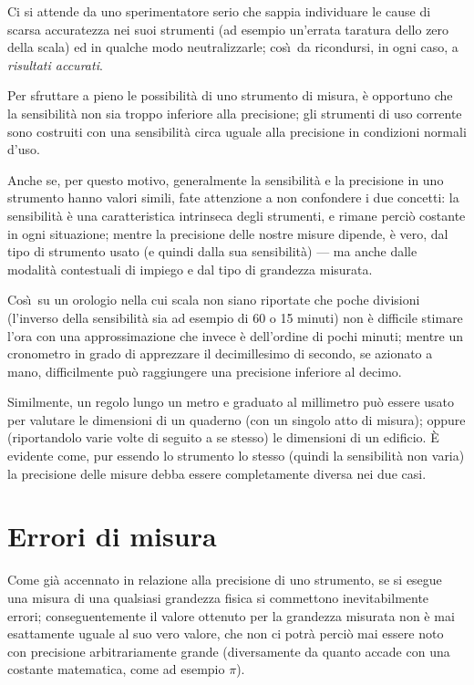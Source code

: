 \begin{itemize}
  Ci si attende da uno sperimentatore serio che sappia
  individuare le cause di scarsa accuratezza nei suoi
  strumenti (ad esempio un'errata taratura dello zero della
  scala) ed in qualche modo neutralizzarle; cos\`\i\ da
  ricondursi, in ogni caso, a \emph{risultati accurati}.
\end{itemize}%

Per sfruttare a pieno le possibilit\`a di uno strumento di
misura, \`e opportuno che la sensibilit\`a non sia troppo
inferiore alla precisione; gli strumenti di uso corrente
sono costruiti con una sensibilit\`a circa uguale alla
precisione in condizioni normali d'uso.

Anche se, per questo motivo, generalmente la sensibilit\`a e
la precisione in uno strumento hanno valori simili, fate
attenzione a non confondere i due concetti: la sensibilit\`a
\`e una caratteristica intrinseca degli strumenti, e rimane
perci\`o costante in ogni situazione; mentre la precisione
delle nostre misure dipende, \`e vero, dal tipo di strumento
usato (e quindi dalla sua sensibilit\`a) --- ma anche dalle
modalit\`a contestuali di impiego e dal tipo di grandezza
misurata.

Cos\`\i\ su un orologio nella cui scala non siano
riportate che poche divisioni (l'inverso della sensibilit\`a
sia ad esempio di 60 o 15 minuti) non \`e difficile stimare
l'ora con una approssimazione che invece \`e dell'ordine di
pochi minuti; mentre un cronometro in grado di apprezzare il
decimillesimo di secondo, se azionato a mano, difficilmente
pu\`o raggiungere una precisione inferiore al decimo.

Similmente, un regolo lungo un metro e graduato al
millimetro pu\`o essere usato per valutare le dimensioni di
un quaderno (con un singolo atto di misura); oppure
(riportandolo varie volte di seguito a se stesso) le
dimensioni di un edificio.  \`E evidente come, pur essendo
lo strumento lo stesso (quindi la sensibilit\`a non varia)
la precisione delle misure debba essere completamente
diversa nei due casi.%

\section{Errori di misura}
\label{ch:2.errmis}
Come gi\`a accennato in relazione alla precisione di uno
strumento, se si esegue una misura di una qualsiasi
grandezza fisica si commettono inevitabilmente errori;
conseguentemente il valore ottenuto per la grandezza
misurata non \`e mai esattamente uguale al suo vero valore,
che non ci potr\`a perci\`o mai essere noto con precisione
arbitrariamente grande (diversamente da quanto accade con
una costante matematica, come ad esempio $\pi$).


